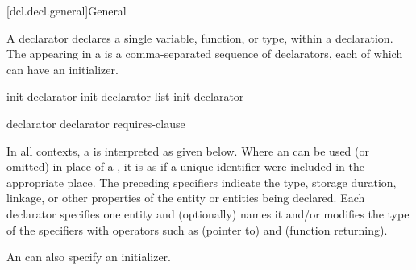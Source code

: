 [dcl.decl.general]{General}%

%
%
%
%
%

\pnum
A declarator declares a single variable, function, or type, within a declaration.
The
appearing in a 
is a comma-separated sequence of declarators,
each of which can have an initializer.

\begin{bnf}
\br
    init-declarator\br
    init-declarator-list \terminal{,} init-declarator
\end{bnf}

\begin{bnf}
\br
    declarator \br
    declarator requires-clause
\end{bnf}

\pnum
In all contexts, a  is interpreted as given below.
Where an  can be used (or omitted)
in place of a ,
it is as if a unique identifier were included in
the appropriate place.
The preceding specifiers indicate
the type, storage duration, linkage, or other properties
of the entity or entities being declared.
Each declarator specifies one entity and
(optionally) names it and/or
modifies the type of the specifiers with operators such as
\tcode{*} (pointer to) and \tcode{()} (function returning).
\begin{note}
An  can also specify an initializer.
\end{note}

